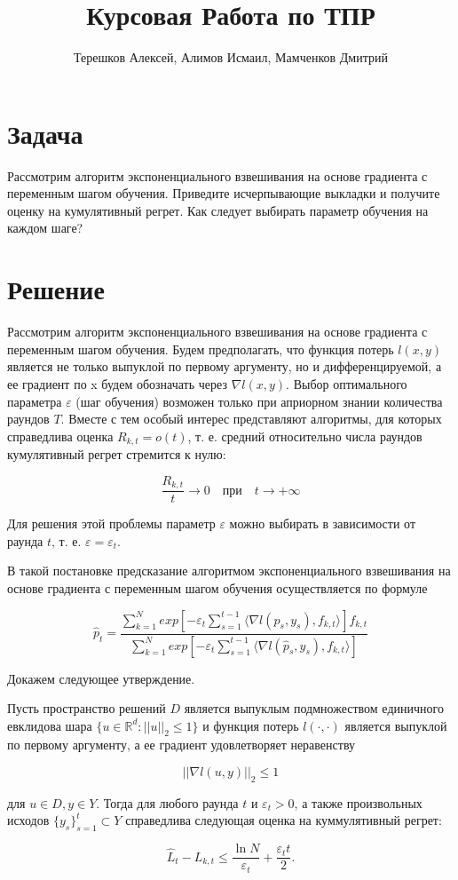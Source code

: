 \documentclass{article}
\title{Курсовая Работа по ТПР}
\author{Терешков Алексей, Алимов Исмаил, Мамченков Дмитрий}
\date{}
\begin{document}
\maketitle

\section{Задача}
Рассмотрим алгоритм экспоненциального взвешивания на основе градиента с переменным шагом обучения. Приведите исчерпывающие выкладки и получите оценку на кумулятивный регрет. Как следует выбирать параметр обучения на каждом шаге?

\section{Решение}
Рассмотрим алгоритм экспоненциального взвешивания на основе градиента с переменным шагом обучения. Будем предполагать, что функция потерь $l(x, y)$ является не только выпуклой по первому аргументу, но и дифференцируемой, а ее градиент по x будем обозначать через $\nabla l(x, y)$. Выбор оптимального параметра $\varepsilon$ (шаг обучения) возможен только при априорном знании количества раундов $T$. Вместе с тем особый интерес представляют алгоритмы, для которых справедлива оценка $R_{k,t} =o(t)$, т. е. средний относительно числа раундов кумулятивный регрет стремится к нулю:

\[
\frac{R_{k,t}}{t} \rightarrow 0 \quad при \quad t \rightarrow +\infty
\]

Для решения этой проблемы параметр $\varepsilon$ можно выбирать в зависимости от раунда $t$, т. е. $\varepsilon = \varepsilon_t$.

В такой постановке предсказание алгоритмом экспоненциального взвешивания на основе градиента  с переменным шагом обучения осуществляется по формуле

\[
\hat{p}_t = \frac{ \sum^N_{k=1} exp[-\varepsilon_t \sum^{t-1}_{s=1} \langle \nabla l(\hat{p}_s, y_s), f_{k,t} \rangle ] f_{k,t} }{ \sum^N_{k=1} exp[-\varepsilon_t \sum^{t-1}_{s=1} \langle \nabla l(\hat{p}_s, y_s), f_{k,t} \rangle ] }
\]

Докажем следующее утверждение.

Пусть пространство решений $D$ является выпуклым подмножеством единичного евклидова шара $\{ u \in \mathbb{R} ^d : \lvert \lvert  u\lvert \lvert_2 \le 1\}$ и функция потерь $l(\cdot, \cdot)$ является
выпуклой по первому аргументу, а ее градиент удовлетворяет неравенству

\[
\lvert \lvert \nabla l(u, y) \lvert \lvert_2 \le 1
\]

для $u \in D, y \in Y$. Тогда для любого раунда $t$ и $\varepsilon_t > 0$, а также произвольных исходов
$\{y_s\}^t_{s=1} \subset Y$ справедлива следующая оценка на куммулятивный регрет:

\[
\hat{L}_t - L_{k,t} \le \frac{\ln{N}}{\varepsilon_t} + \frac{\varepsilon_t t}{2}.
\]
\end{document}
